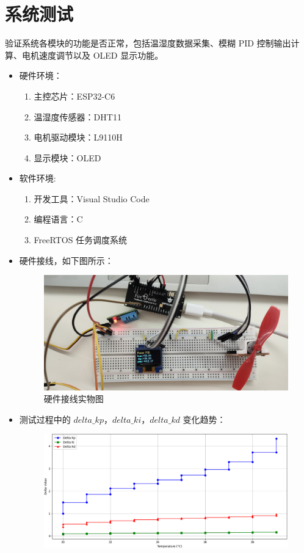 \documentclass[UTF8]{ctexart}
\begin{document}
\section{系统测试}
	验证系统各模块的功能是否正常，包括温湿度数据采集、模糊 PID 控制输出计算、电机速度调节以及 OLED 显示功能。
	\begin{itemize}
		\item 硬件环境：
		\begin{enumerate}
			\item 主控芯片：ESP32-C6
			\item 温湿度传感器：DHT11
			\item 电机驱动模块：L9110H
			\item 显示模块：OLED
		\end{enumerate}
		\item 软件环境:		
		\begin{enumerate}
			\item 开发工具：Visual Studio Code
			\item 编程语言：C
			\item FreeRTOS 任务调度系统
		\end{enumerate}
		\item 硬件接线，如下图所示：
		\begin{figure}[htbp]
			\centering
			\includegraphics[width=0.85\linewidth]{figure/c}
			\caption{硬件接线实物图} %
			\label{fig:image9} %
		\end{figure}
		\item 测试过程中的 $delta\_kp$，$delta\_ki$，$delta\_kd$ 变化趋势：
		\begin{figure}[htbp]
			\centering
			\includegraphics[width=0.85\linewidth]{figure/vs}

\end{figure}
\end{itemize}
\end{document}
